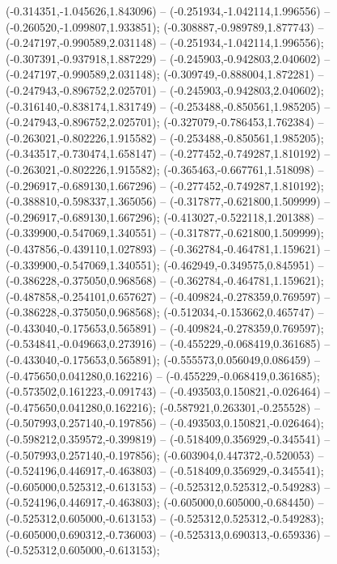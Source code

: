  (-0.314351,-1.045626,1.843096) -- (-0.251934,-1.042114,1.996556) -- (-0.260520,-1.099807,1.933851);
 (-0.308887,-0.989789,1.877743) -- (-0.247197,-0.990589,2.031148) -- (-0.251934,-1.042114,1.996556);
 (-0.307391,-0.937918,1.887229) -- (-0.245903,-0.942803,2.040602) -- (-0.247197,-0.990589,2.031148);
 (-0.309749,-0.888004,1.872281) -- (-0.247943,-0.896752,2.025701) -- (-0.245903,-0.942803,2.040602);
 (-0.316140,-0.838174,1.831749) -- (-0.253488,-0.850561,1.985205) -- (-0.247943,-0.896752,2.025701);
 (-0.327079,-0.786453,1.762384) -- (-0.263021,-0.802226,1.915582) -- (-0.253488,-0.850561,1.985205);
 (-0.343517,-0.730474,1.658147) -- (-0.277452,-0.749287,1.810192) -- (-0.263021,-0.802226,1.915582);
 (-0.365463,-0.667761,1.518098) -- (-0.296917,-0.689130,1.667296) -- (-0.277452,-0.749287,1.810192);
 (-0.388810,-0.598337,1.365056) -- (-0.317877,-0.621800,1.509999) -- (-0.296917,-0.689130,1.667296);
 (-0.413027,-0.522118,1.201388) -- (-0.339900,-0.547069,1.340551) -- (-0.317877,-0.621800,1.509999);
 (-0.437856,-0.439110,1.027893) -- (-0.362784,-0.464781,1.159621) -- (-0.339900,-0.547069,1.340551);
 (-0.462949,-0.349575,0.845951) -- (-0.386228,-0.375050,0.968568) -- (-0.362784,-0.464781,1.159621);
 (-0.487858,-0.254101,0.657627) -- (-0.409824,-0.278359,0.769597) -- (-0.386228,-0.375050,0.968568);
 (-0.512034,-0.153662,0.465747) -- (-0.433040,-0.175653,0.565891) -- (-0.409824,-0.278359,0.769597);
 (-0.534841,-0.049663,0.273916) -- (-0.455229,-0.068419,0.361685) -- (-0.433040,-0.175653,0.565891);
 (-0.555573,0.056049,0.086459) -- (-0.475650,0.041280,0.162216) -- (-0.455229,-0.068419,0.361685);
 (-0.573502,0.161223,-0.091743) -- (-0.493503,0.150821,-0.026464) -- (-0.475650,0.041280,0.162216);
 (-0.587921,0.263301,-0.255528) -- (-0.507993,0.257140,-0.197856) -- (-0.493503,0.150821,-0.026464);
 (-0.598212,0.359572,-0.399819) -- (-0.518409,0.356929,-0.345541) -- (-0.507993,0.257140,-0.197856);
 (-0.603904,0.447372,-0.520053) -- (-0.524196,0.446917,-0.463803) -- (-0.518409,0.356929,-0.345541);
 (-0.605000,0.525312,-0.613153) -- (-0.525312,0.525312,-0.549283) -- (-0.524196,0.446917,-0.463803);
 (-0.605000,0.605000,-0.684450) -- (-0.525312,0.605000,-0.613153) -- (-0.525312,0.525312,-0.549283);
 (-0.605000,0.690312,-0.736003) -- (-0.525313,0.690313,-0.659336) -- (-0.525312,0.605000,-0.613153);
